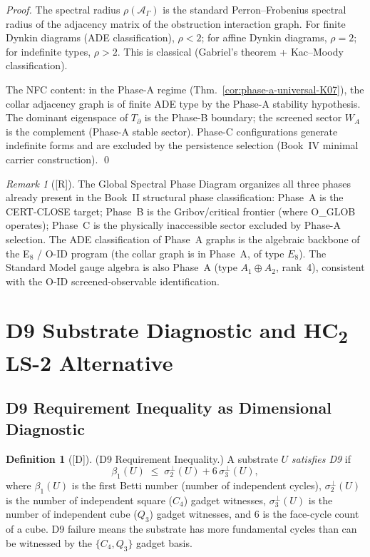 \documentclass[12pt,oneside]{amsbook}
\theoremstyle{plain}
\theoremstyle{definition}
\newtheorem{definition}[theorem]{Definition}
\theoremstyle{remark}
\newtheorem{remark}[theorem]{Remark}
\newcommand{\status}[1]{\textup{[#1]}}
\begin{document}
\begin{proof}
The spectral radius $\rho(\mathcal{A}_\Gamma)$ is the standard
Perron--Frobenius spectral radius of the adjacency matrix of
the obstruction interaction graph.  For finite Dynkin diagrams
(ADE classification), $\rho < 2$; for affine Dynkin diagrams,
$\rho = 2$; for indefinite types, $\rho > 2$.  This is classical
(Gabriel's theorem + Kac--Moody classification).

The NFC content: in the Phase-A regime (Thm.~\ref{cor:phase-a-universal-K07}),
the collar adjacency graph is of finite ADE type by the
Phase-A stability hypothesis.  The dominant eigenspace of
$T_\partial$ is the Phase-B boundary; the screened sector $W_A$
is the complement (Phase-A stable sector).  Phase-C configurations
generate indefinite forms and are excluded by the persistence
selection (Book~IV minimal carrier construction). \qed
\end{proof}

\begin{remark}[\status{R}]
The Global Spectral Phase Diagram organizes all three phases
already present in the Book~II structural phase classification:
Phase~A is the CERT-CLOSE target; Phase~B is the Gribov/critical
frontier (where O\_GLOB operates); Phase~C is the physically
inaccessible sector excluded by Phase-A selection.  The ADE
classification of Phase~A graphs is the algebraic backbone
of the E$_8$ / O-ID program (the collar graph is in Phase~A,
of type $E_8$).  The Standard Model gauge algebra is also
Phase~A (type $A_1 \oplus A_2$, rank~4), consistent with
the O-ID screened-observable identification.
\end{remark}

\section{D9 Substrate Diagnostic and HC\textsubscript{2} LS-2 Alternative}
\label{sec:d9-hc2}

\subsection{D9 Requirement Inequality as Dimensional Diagnostic}

\begin{definition}[\status{D}]\label{def:D9-inequality}
\textup{(D9 Requirement Inequality.)}
A substrate $U$ \emph{satisfies D9} if
\[
  \beta_1(U) \;\leq\; \sigma^\perp_2(U) + 6\,\sigma^\perp_3(U),
\]
where $\beta_1(U)$ is the first Betti number (number of independent
cycles), $\sigma^\perp_2(U)$ is the number of independent square
($C_4$) gadget witnesses, $\sigma^\perp_3(U)$ is the number of
independent cube ($Q_3$) gadget witnesses, and $6$ is the face-cycle
count of a cube.  D9 failure means the substrate has more fundamental
cycles than can be witnessed by the $\{C_4, Q_3\}$ gadget basis.
\end{definition}
\end{document}
